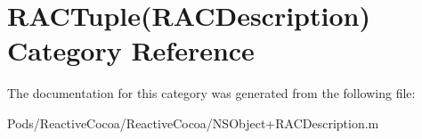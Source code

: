 \hypertarget{category_r_a_c_tuple_07_r_a_c_description_08}{}\section{R\+A\+C\+Tuple(R\+A\+C\+Description) Category Reference}
\label{category_r_a_c_tuple_07_r_a_c_description_08}


The documentation for this category was generated from the following file\+:\begin{DoxyCompactItemize}
\item 
Pods/\+Reactive\+Cocoa/\+Reactive\+Cocoa/N\+S\+Object+\+R\+A\+C\+Description.\+m\end{DoxyCompactItemize}

